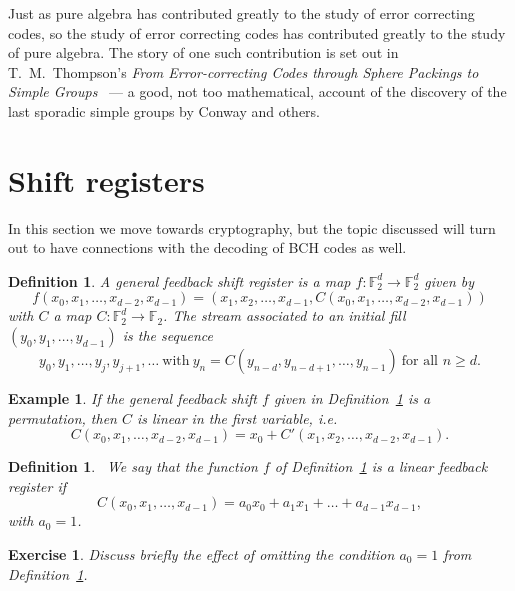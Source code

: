 \documentclass[12pt,a4paper]{article}
\theoremstyle{plain}
\newtheorem{definition}[theorem]{Definition}
\newtheorem{example}[theorem]{Example}
\newtheorem{exercise}[theorem]{Exercise}
\theoremstyle{definition}
\begin{document}
    Just as pure algebra has contributed greatly
    to the study of error correcting codes, so
    the study of error correcting codes has contributed
    greatly to the study of pure algebra.
    The story of one such contribution is set out
    in T.~M.~Thompson's
    \emph{From Error-correcting Codes through Sphere Packings
    to Simple Groups}~\cite{Thompson} --- a good, not too
    mathematical, account of
    the discovery of the last
    sporadic simple groups by Conway and others.
    \section{Shift registers}\label{section shift}
    In this section we move
    towards cryptography, but the topic discussed will
    turn out to have connections with the decoding
    of BCH codes as well.

    \begin{definition}
        \label{general feed}
        A \emph{general feedback shift register} is a map
        $f:{\mathbb F}_{2}^{d}\rightarrow {\mathbb F}_{2}^{d}$
        given by
        \[f(x_{0},x_{1},\dots,x_{d-2},x_{d-1})
        =(x_{1},x_{2},\dots,x_{d-1},C(x_{0},x_{1},\dots,x_{d-2},x_{d-1}))\]
        with $C$ a map $C:{\mathbb F}_{2}^{d}\rightarrow {\mathbb F}_{2}$.
        The \emph{stream} associated to an \emph{initial fill}
        $(y_{0},y_{1},\dots,y_{d-1})$ is the sequence
        \[y_{0},y_{1},\dots,y_{j},y_{j+1},\dots
        \ \text{with}\ y_{n}=C(y_{n-d},y_{n-d+1},\dots,y_{n-1})
        \ \text{for all $n\geq d$.}\]
    \end{definition}

    \begin{example}
        If the general feedback shift $f$
        given in Definition~\ref{general feed} is a permutation,
        then $C$ is linear in the first variable, i.e.
        \[C(x_{0},x_{1},\dots,x_{d-2},x_{d-1})
        =x_{0}+C'(x_{1},x_{2},\dots,x_{d-2},x_{d-1}).\]
    \end{example}
    \begin{definition}
        ~\label{linear feed}
        We say that the function $f$
        of Definition~\ref{general feed} is
        a \emph{linear feedback register} if
        \[C(x_{0},x_{1},\dots,x_{d-1})=
        a_{0}x_{0}+a_{1}x_{1}+\ldots+a_{d-1}x_{d-1},\]
        with $a_{0}=1$.
    \end{definition}
    \begin{exercise}
        Discuss briefly the effect
        of omitting the condition
        $a_{0}=1$ from Definition~\ref{linear feed}.
    \end{exercise}
\end{document}
